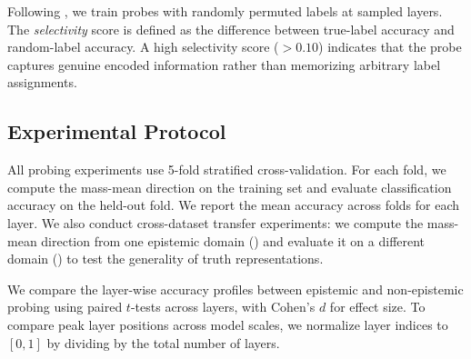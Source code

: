 Following \citet{hewitt2019designing}, we train probes with randomly permuted labels at sampled layers. The \emph{selectivity} score is defined as the difference between true-label accuracy and random-label accuracy. A high selectivity score ($> 0.10$) indicates that the probe captures genuine encoded information rather than memorizing arbitrary label assignments.

\subsection{Experimental Protocol}
\label{sec:protocol}

All probing experiments use 5-fold stratified cross-validation. For each fold, we compute the mass-mean direction on the training set and evaluate classification accuracy on the held-out fold. We report the mean accuracy across folds for each layer. We also conduct cross-dataset transfer experiments: we compute the mass-mean direction from one epistemic domain (\eg \cities) and evaluate it on a different domain (\eg \companies) to test the generality of truth representations.

We compare the layer-wise accuracy profiles between epistemic and non-epistemic probing using paired $t$-tests across layers, with Cohen's $d$ for effect size. To compare peak layer positions across model scales, we normalize layer indices to $[0, 1]$ by dividing by the total number of layers.

